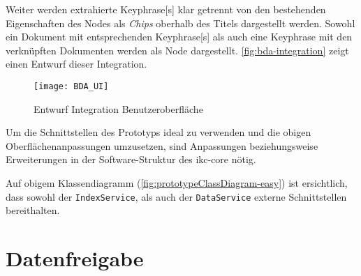 Weiter werden extrahierte \gls{Keyphrase}[s] klar getrennt von den bestehenden Eigenschaften des Nodes als \textit{Chips} oberhalb des Titels dargestellt werden. Sowohl ein Dokument mit entsprechenden \gls{Keyphrase}[s] als auch eine \gls{Keyphrase} mit den verknüpften Dokumenten werden als Node dargestellt. \autoref{fig:bda-integration} zeigt einen Entwurf dieser Integration. 

    \begin{figure}[H]
    \centering
    \texttt{[image: BDA\_UI]}
    \caption{Entwurf Integration Benutzeroberfläche}
    \label{fig:bda-integration}
    \end{figure}

Um die Schnittstellen des Prototyps ideal zu verwenden und die obigen Oberflächenanpassungen umzusetzen, sind Anpassungen beziehungsweise Erweiterungen in der Software-Struktur des \gls{ikc-core} nötig. 

Auf obigem Klassendiagramm (\autoref{fig:prototypeClassDiagram-easy}) ist ersichtlich, dass sowohl der \texttt{IndexService}, als auch der \texttt{DataService} externe Schnittstellen bereithalten.





\section{Datenfreigabe}\label{l-datenfreigabe}



